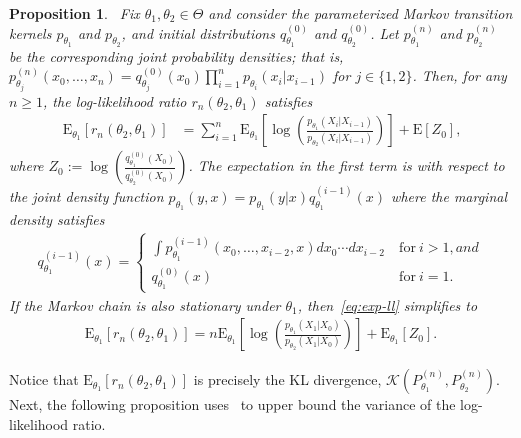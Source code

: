 \documentclass[11pt]{amsart}
\newcommand{\E}{\mathrm{E}}
\newtheorem{proposition}{Proposition}[section]
\begin{document}
\begin{proposition}~\label{prop:1a}
Fix $\theta_1,\theta_2 \in \Theta$ and consider the parameterized Markov transition kernels  $p_{\theta_1}$ and $p_{\theta_2}$, and initial distributions $q^{(0)}_{\theta_1}$ and $q^{(0)}_{\theta_2}$. Let $p_{\theta_1}^{(n)}$ and $p_{\theta_2}^{(n)}$ be the corresponding joint probability densities; that is,
\(
    p_{\theta_j}^{(n)}(x_0,\ldots,x_n) = q_{\theta_j}^{(0)}(x_0)\prod_{i=1}^{n} p_{\theta_i}(x_i|x_{i-1})
\)
for $j \in \{1,2\}$. Then, for any $n \geq 1$, the log-likelihood ratio $r_n(\theta_2,\theta_1)$ satisfies
\begin{align}~\label{eq:exp-ll}
     \E_{\theta_1}\left[ r_n(\theta_2,\theta_1) \right] %
     &= \sum_{i=1}^n \E_{\theta_1} \left[ \log \left( \frac{p_{\theta_1}(X_i|X_{i-1})}{p_{\theta_2}(X_i|X_{i-1})}\right) \right]+\E[Z_0],
\end{align}
where $Z_0 := \log\left(\frac{q^{(0)}_{\theta_1}(X_0)}{q^{(0)}_{\theta_2}(X_0)}\right)$. The expectation in the first term is with respect to the joint density function $p_{\theta_1}(y,x) = p_{\theta_1}(y|x) q^{(i-1)}_{\theta_1}(x)$ where the marginal density satisfies
\begin{align*}
q^{(i-1)}_{\theta_1}(x)=\begin{cases}
\int p_{\theta_1}^{(i-1)}(x_0,\ldots,x_{i-2},x) dx_{0}\cdots dx_{i-2}&~\text{for}~i > 1, and\\
 q_{\theta_1}^{(0)}(x)&~\text{for}~i = 1.
\end{cases}
\end{align*}
If the Markov chain is also stationary under $\theta_1$, then~\cref{eq:exp-ll} simplifies to
\begin{align}
    \E_{\theta_1}\left[ r_n(\theta_2,\theta_1) \right]=n\E_{\theta_1} \left[ \log\left( \frac{p_{\theta_1}(X_1|X_0)}{p_{\theta_2}(X_1|X_0)} \right) \right]+\E_{\theta_1}[Z_0].
\end{align}
\end{proposition}
Notice that $\E_{\theta_1}\left[ r_n(\theta_2,\theta_1) \right]$ is precisely the KL divergence, $\mathcal{K}(P^{(n)}_{\theta_1},P^{(n)}_{\theta_2})$. Next, the following proposition uses~\citep[Lemma 1.3]{ibrag} to upper bound the variance of the log-likelihood ratio.
\end{document}
